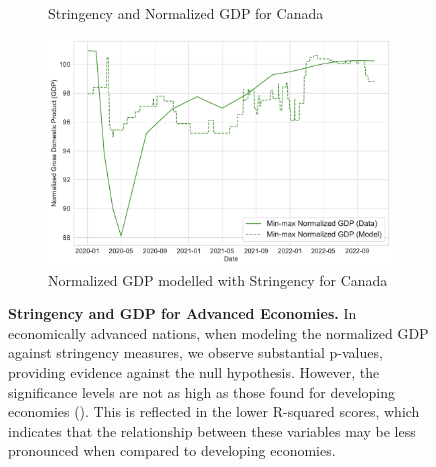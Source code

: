 \documentclass[tikz,fleqn,12pt]{wlscirep}
\begin{document}
\begin{figure}[htbp!]
\begin{subfigure}[t]{0.48\textwidth}
    \caption{Stringency and Normalized GDP for Canada}
    \label{fig:stringency_vs_gdp_CAN}
  \end{subfigure}
  \hfill
  \begin{subfigure}[t]{0.48\textwidth}
    \centering
    \includegraphics[width=\linewidth]{images/gdp_modelled_with_stringency_CAN.pdf}
    \caption{Normalized GDP modelled with Stringency for Canada}
    \label{fig:gdp_modelled_with_stringency_CAN}
  \end{subfigure}
  \caption{\textbf{Stringency and GDP for Advanced Economies.} In economically advanced nations, when modeling the normalized GDP against stringency measures, we observe substantial p-values, providing evidence against the null hypothesis. However, the significance levels are not as high as those found for developing economies (). This is reflected in the lower R-squared scores, which indicates that the relationship between these variables may be less pronounced when compared to developing economies.}
  \label{fig:stringency_gdp_advanced}
\end{figure}
\end{document}
